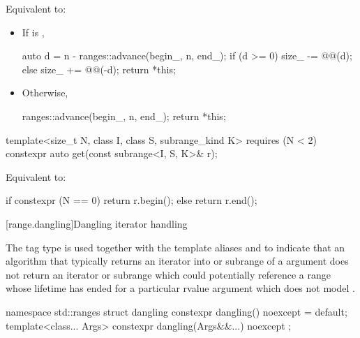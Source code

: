 \begin{itemdescr}
\pnum
\effects
Equivalent to:
\begin{itemize}
\item If  is ,
\begin{codeblock}
auto d = n - ranges::advance(begin_, n, end_);
if (d >= 0)
  size_ -= @@(d);
else
  size_ += @@(-d);
return *this;
\end{codeblock}
\item Otherwise,
\begin{codeblock}
ranges::advance(begin_, n, end_);
return *this;
\end{codeblock}
\end{itemize}
\end{itemdescr}

%
\begin{itemdecl}
template<size_t N, class I, class S, subrange_kind K>
  requires (N < 2)
constexpr auto get(const subrange<I, S, K>& r);
\end{itemdecl}

\begin{itemdescr}
\pnum
\effects
Equivalent to:
\begin{codeblock}
if constexpr (N == 0)
  return r.begin();
else
  return r.end();
\end{codeblock}
\end{itemdescr}

[range.dangling]{Dangling iterator handling}

\pnum
The tag type  is used together
with the template aliases  and 
to indicate that an algorithm
that typically returns an iterator into or subrange of a  argument
does not return an iterator or subrange
which could potentially reference a range
whose lifetime has ended for a particular rvalue  argument
which does not model .
%
\begin{codeblock}
namespace std::ranges {
  struct dangling {
    constexpr dangling() noexcept = default;
    template<class... Args>
      constexpr dangling(Args&&...) noexcept { }
  };
}
\end{codeblock}

